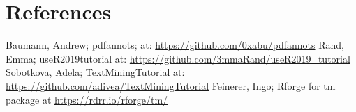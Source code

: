 \documentclass{article}
\begin{document}
\section{References}
Baumann, Andrew; pdfannots; at: \url{https://github.com/0xabu/pdfannots} \newline
Rand, Emma; useR2019\textunderscore tutorial at: \url{https://github.com/3mmaRand/useR2019_tutorial} \newline
Sobotkova, Adela; TextMiningTutorial at:\newline
\url{https://github.com/adivea/TextMiningTutorial} \newline
Feinerer, Ingo; Rforge for tm package at \url{https://rdrr.io/rforge/tm/} \newline
\end{document}
